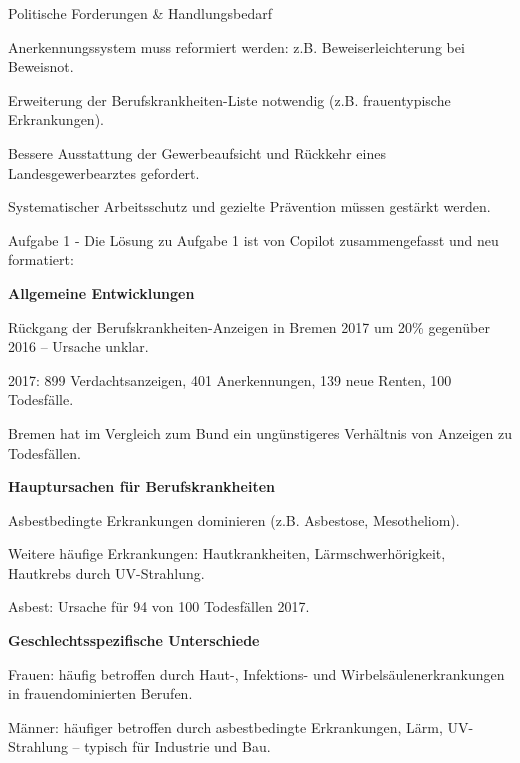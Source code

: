 Politische Forderungen & Handlungsbedarf
\begin{myitemize}
\item Anerkennungssystem muss reformiert werden: z.B. Beweiserleichterung bei Beweisnot.
\item Erweiterung der Berufskrankheiten-Liste notwendig (z.B. frauentypische Erkrankungen).
\item Bessere Ausstattung der Gewerbeaufsicht und Rückkehr eines Landesgewerbearztes gefordert.
\item Systematischer Arbeitsschutz und gezielte Prävention müssen gestärkt werden.
\end{myitemize}
Aufgabe 1 - Die Lösung zu Aufgabe 1 ist von Copilot zusammengefasst und neu formatiert:

\textbf{Allgemeine Entwicklungen}
\begin{myitemize}
\item Rückgang der Berufskrankheiten-Anzeigen in Bremen 2017 um 20\% gegenüber 2016 – Ursache unklar.
\item 2017: 899 Verdachtsanzeigen, 401 Anerkennungen, 139 neue Renten, 100 Todesfälle.
\item Bremen hat im Vergleich zum Bund ein ungünstigeres Verhältnis von Anzeigen zu Todesfällen.
\end{myitemize}


\textbf{Hauptursachen für Berufskrankheiten}
\begin{myitemize}
\item Asbestbedingte Erkrankungen dominieren (z.B. Asbestose, Mesotheliom).
\item Weitere häufige Erkrankungen: Hautkrankheiten, Lärmschwerhörigkeit, Hautkrebs durch UV-Strahlung.
\item Asbest: Ursache für 94 von 100 Todesfällen 2017.
\end{myitemize}


\textbf{Geschlechtsspezifische Unterschiede}
\begin{myitemize}
\item Frauen: häufig betroffen durch Haut-, Infektions- und Wirbelsäulenerkrankungen in frauendominierten Berufen.
\item Männer: häufiger betroffen durch asbestbedingte Erkrankungen, Lärm, UV-Strahlung – typisch für Industrie und Bau.
\end{myitemize}


